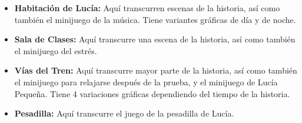 \begin{itemize}
    \item \textbf{Habitación de Lucía:} Aquí transcurren escenas de la historia, así como también el minijuego de la música. Tiene variantes gráficas de día y de noche.
    \item \textbf{Sala de Clases:} Aquí transcurre una escena de la historia, así como también el minijuego del estrés.
    \item \textbf{Vías del Tren:} Aquí transcurre mayor parte de la historia, así como también el minijuego para relajarse después de la prueba, y el minijuego de Lucía Pequeña. Tiene 4 variaciones gráficas dependiendo del tiempo de la historia.
    \item \textbf{Pesadilla:} Aquí transcurre el juego de la pesadilla de Lucía.
\end{itemize}

